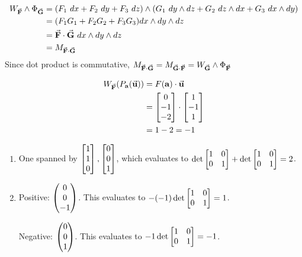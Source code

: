 \documentclass{homework}
\begin{document}
\begin{problem}{4}
  \begin{align*}
    W_{\vec{\mathbf{F}}} \land \Phi_{\vec{\mathbf{G}}} &=
    (F_1\ dx + F_2\ dy + F_3\ dz) \land
    (G_1\ dy \land dz + G_2\ dz \land dx + G_3\ dx \land dy) \\ &=
    (F_1G_1 + F_2G_2 + F_3G_3) dx \land dy \land dz \\ &=
    \vec{\mathbf{F}} \cdot \vec{\mathbf{G}}\ dx \land dy \land dz \\ &=
    M_{\vec{\mathbf{F}} \cdot \vec{\mathbf{G}}}
  \end{align*}
  Since dot product is commutative,
  $ M_{\vec{\mathbf{F}} \cdot \vec{\mathbf{G}}}
  = M_{\vec{\mathbf{G}} \cdot \vec{\mathbf{F}}}
  = W_{\vec{\mathbf{G}}} \land \Phi_{\vec{\mathbf{F}}}$ \QED
\end{problem}

\begin{problem}{5}
  \begin{align*}
    W_{\vec{\mathbf{F}}}(P_{\mathbf{a}}(\vec{\mathbf{u}})) &=
    F(\mathbf{a}) \cdot \vec{\mathbf{u}} \\ &=
    \begin{bmatrix}0 \\ -1 \\ -2\end{bmatrix} \cdot \begin{bmatrix}1 \\ -1 \\ 1\end{bmatrix} \\ &=
    1 - 2 = -1
  \end{align*}
\end{problem}

\begin{problem}{6}
  \begin{enumerate}
    \item
      One spanned by $\begin{bmatrix}1 \\ 1 \\ 0\end{bmatrix}, \begin{bmatrix}0 \\ 0 \\ 1\end{bmatrix}$, which evaluates
      to $\det\begin{bmatrix}1 & 0 \\ 0 & 1\end{bmatrix} + \det\begin{bmatrix}1 & 0 \\ 0 & 1\end{bmatrix} = 2$.
    \item
      Positive: $\begin{pmatrix}0 \\ 0 \\ -1\end{pmatrix}$. This evaluates to
      $-(-1) \det\begin{bmatrix}1 & 0 \\ 0 & 1\end{bmatrix} = 1$.

      Negative: $\begin{pmatrix}0 \\ 0 \\ 1\end{pmatrix}$. This evaluates to
      $-1 \det\begin{bmatrix}1 & 0 \\ 0 & 1\end{bmatrix} = -1$.
  \end{enumerate}
\end{problem}
\end{document}
